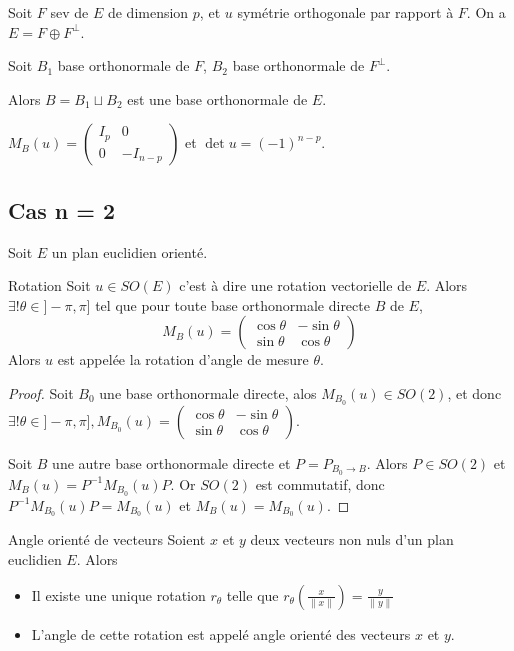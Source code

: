 Soit $F$ sev de $E$ de dimension $p$, et $u$ symétrie orthogonale par rapport à $F$. 
On a $E = F \oplus F^\perp$. 

Soit $B_1$ base orthonormale de $F$, $B_2$ base orthonormale de $F^\perp$. 

Alors $B = B_1 \sqcup B_2$ est une base orthonormale de $E$. 

$M_B(u) = \begin{pmatrix}
    I_p & 0 \\
    0 & - I_{n - p}
\end{pmatrix}$ et $\det u = (-1)^{n - p}$.

\subsection{Cas n = 2}

Soit $E$ un plan euclidien orienté. 

\begin{theoreme}{Rotation}{}
    Soit $u \in SO(E)$ c'est à dire une rotation vectorielle de $E$. 
    Alors $\exists ! \theta \in ]- \pi, \pi]$ tel que pour toute base orthonormale directe
    $B$ de $E$, 
$$M_B(u) = \begin{pmatrix}
    \cos \theta & -\sin \theta \\
    \sin \theta & \cos \theta
\end{pmatrix}$$
    Alors $u$ est appelée la rotation d'angle de mesure $\theta$. 
\end{theoreme}


\begin{proof}
    Soit $B_0$ une base orthonormale directe, alos 
    $M_{B_0}(u) \in SO(2)$, et donc 
    $\exists ! \theta \in ]- \pi, \pi], M_{B_0}(u) = \begin{pmatrix}
    \cos \theta & -\sin \theta \\
    \sin \theta & \cos \theta
\end{pmatrix}$.

    Soit $B$ une autre base orthonormale directe et $P = P_{B_0 \to B}$. Alors
    $P \in SO(2)$ et $M_B(u) = P^{-1} M_{B_0}(u) P$. 
    Or $SO(2)$ est commutatif, donc $P^{-1} M_{B_0}(u) P = M_{B_0}(u)$ et $M_B(u) = M_{B_0}(u)$.
\end{proof}

\begin{theoreme}{Angle orienté de vecteurs}{}
    Soient $x$ et $y$ deux vecteurs non nuls d'un plan euclidien $E$. Alors 
    \begin{itemize}
        \item Il existe une unique rotation $r_\theta$ telle que $r_\theta\left( \frac x {\| x \|} \right) = \frac y {\| y \|}$
        \item L'angle de cette rotation est appelé angle orienté des vecteurs $x$ et $y$.
    \end{itemize}
\end{theoreme}

